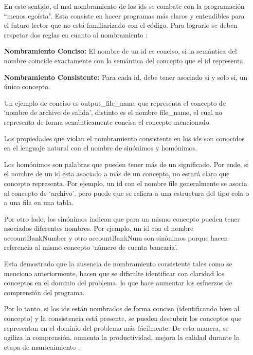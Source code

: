 \documentclass[a4paper,12pt]{report}
\begin{document}
En este sentido, el mal nombramiento de los ids se combate con la programación “menos egoísta”. Esta consiste en hacer programas más claros y entendibles para el futuro lector que no está familiarizado con el código. Para lograrlo se deben respetar dos reglas en cuanto al nombramiento \cite{DFPM05,DLHD06}:

\begin{framed}
\noindent \textbf{Nombramiento Conciso:} El nombre de un id es conciso, si la semántica del nombre coincide exactamente con la semántica del concepto que el id representa.

\noindent \textbf{Nombramiento  Consistente:} Para cada id, debe tener asociado si y solo si, un único concepto.
\end{framed}

Un ejemplo de conciso es \textsf{output\_file\_name} que representa el concepto de `nombre de archivo de salida', distinto es el nombre \textsf{file\_name}, el cual no representa de forma semánticamente concisa el concepto mencionado.

Los propiedades que violan el nombramiento consistente en los ids son conocidos en el lenguaje natural con el nombre de sinónimos y homónimos. 

Los homónimos son palabras que pueden tener más de un significado. Por ende, si el nombre de un id esta asociado a más de un concepto, no estará claro que concepto representa. Por ejemplo, un id con el nombre \textsf{file} generalmente se asocia al concepto de `archivo', pero puede que se refiera a una estructura del tipo cola o a una fila en una tabla.

Por otro lado, los sinónimos indican que para un mismo concepto pueden tener asociados diferentes nombres. Por ejemplo, un id con el nombre \mbox{\textsf{accountBankNumber}} y otro \textsf{accountBankNum} son sinónimos porque hacen referencia al mismo concepto `número de cuenta bancaria'. 

Esta demostrado \cite{DFPM05,DLHD06,DMDJ13} que la ausencia de nombramiento consistente tales como se menciono anteriormente, hacen que se dificulte identificar con claridad los conceptos en el dominio del problema, lo que hace aumentar los esfuerzos de comprensión del programa. 


Por lo tanto, si los ids están nombrados de forma concisa (identificando bien al concepto) y la consistencia está presente, se pueden descubrir los conceptos que representan en el dominio del problema más fácilmente. De esta manera, se agiliza la comprensión, aumenta la productividad, mejora la calidad durante la etapa de mantenimiento \cite{DFPM05,DLHD06}.%
\end{document}
